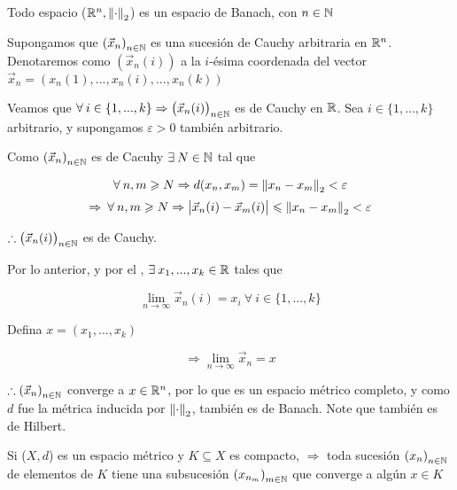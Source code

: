 \begin{eg}
    Todo espacio ($\mathbb{R}^n , \norm{\cdot}_2$) es un espacio de Banach, con $n \in \mathbb{N}$
\end{eg}

\begin{proofexplanation}
     Supongamos que ${\left( \vec{x}_n \right)}_{n \in \mathbb{N}}$ es una sucesión de Cauchy arbitraria en $\mathbb{R}^n$. Denotaremos como $(\vec{x}_n(i))$ a la $i$-ésima coordenada del vector $\vec{x}_n = (x_n(1), ..., x_n(i), ..., x_n(k))$

     Veamos que $\forall \: i \in \{ 1 , ..., k \} \Rightarrow {\left( \vec{x}_n(i) \right)}_{n \in \mathbb{N}}$ es de Cauchy en $\mathbb{R}$. Sea $ i \in \{ 1 , ..., k \} $ arbitrario, y supongamos $\varepsilon > 0$ también arbitrario. 

     Como ${\left( \vec{x}_n \right)}_{n \in \mathbb{N}}$ es de Cacuhy $\exists \: N \in \mathbb{N}$ tal que 
     
     $$\forall \: n, m \geqslant N \Rightarrow d(x_n, x_m) = \norm{x_n - x_m}_2 < \varepsilon$$
     $$\Rightarrow \: \forall \: n, m \geqslant N \Rightarrow \abs{\vec{x}_n(i)-\vec{x}_m(i)} \leqslant \norm{x_n - x_m}_2 < \varepsilon$$

     $\therefore {\left( \vec{x}_n(i) \right)}_{n \in \mathbb{N}}$ es de Cauchy.

     Por lo anterior, y por el , $\exists \: x_1, ..., x_k \in \mathbb{R}$ tales que

     $$\lim_{n \to \infty} \vec{x}_n(i)  = x_ i \: \forall \: i \in  \{ 1 , ..., k \}$$

     Defina $x = (x_1, ..., x_k)$

     $$\Rightarrow \lim_{n \to \infty} \vec{x}_n  = x$$

     $\therefore {\left( \vec{x}_n \right)}_{n \in \mathbb{N}}$ converge a $x \in \mathbb{R}^n$, por lo que es un espacio métrico completo, y como $d$ fue la métrica inducida por $\norm{\cdot}_2$, también es de Banach. Note que también es de Hilbert. 
\end{proofexplanation}

\begin{lemma} \label{lemma412}
    Si ($X,d$) es un espacio métrico y $K \subseteq X$ es compacto, $\Rightarrow$ toda sucesión ${\left( x_n \right)}_{n \in \mathbb{N}}$ de elementos de $K$ tiene una subsucesión ${\left( x_{n_m} \right)}_{m \in \mathbb{N}}$ que converge a algún $x \in K$
\end{lemma}

